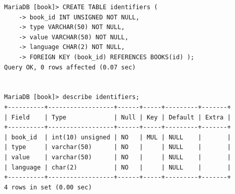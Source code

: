 \documentclass{assignment}
\begin{document}
\begin{verbatim}
MariaDB [book]> CREATE TABLE identifiers (
    -> book_id INT UNSIGNED NOT NULL, 
    -> type VARCHAR(50) NOT NULL, 
    -> value VARCHAR(50) NOT NULL, 
    -> language CHAR(2) NOT NULL, 
    -> FOREIGN KEY (book_id) REFERENCES BOOKS(id) );
Query OK, 0 rows affected (0.07 sec)


MariaDB [book]> describe identifiers;
+----------+------------------+------+-----+---------+-------+
| Field    | Type             | Null | Key | Default | Extra |
+----------+------------------+------+-----+---------+-------+
| book_id  | int(10) unsigned | NO   | MUL | NULL    |       |
| type     | varchar(50)      | NO   |     | NULL    |       |
| value    | varchar(50)      | NO   |     | NULL    |       |
| language | char(2)          | NO   |     | NULL    |       |
+----------+------------------+------+-----+---------+-------+
4 rows in set (0.00 sec)

\end{verbatim}

 \label{Βιβλιογραφία}



\newpage
\end{document}

